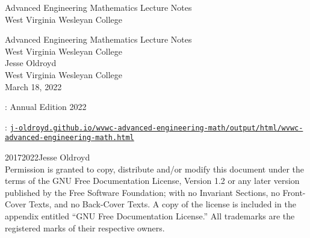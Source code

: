 \documentclass[twoside,10pt,]{book}
\newcommand{\titlepagefont}{\relax}
\newcommand{\mono}[1]{\texttt{#1}}
\numberwithin{equation}{part}
\begin{document}
\raggedbottom
\frontmatter
\thispagestyle{empty}
{\titlepagefont\centering
\vspace*{0.28\textheight}
{\Huge Advanced Engineering Mathematics Lecture Notes}\\[2\baselineskip]
{\LARGE West Virginia Wesleyan College}\\
}
\clearpage
\thispagestyle{empty}
\null%
\clearpage
\thispagestyle{empty}
{\titlepagefont\centering
\vspace*{0.14\textheight}
{\Huge Advanced Engineering Mathematics Lecture Notes}\\[\baselineskip]
{\LARGE West Virginia Wesleyan College}\\[3\baselineskip]
{\Large Jesse Oldroyd}\\[0.5\baselineskip]
{\Large West Virginia Wesleyan College}\\[3\baselineskip]
{\Large March 18, 2022}\\}
\clearpage
\thispagestyle{empty}
\hypertarget{x:colophon:front-colophon}{}
: Annual Edition 2022\par\medskip
{}: \href{https:\slash{}\slash{}j-oldroyd.github.io\slash{}wvwc-advanced-engineering-math\slash{}output\slash{}html\slash{}wvwc-advanced-engineering-math.html}{\mono{j-oldroyd.github.io/wvwc-advanced-engineering-math/output/html/wvwc-advanced-engineering-math.html}}\par\medskip
\noindent\textcopyright{}2017\textendash{}2022\quad{}Jesse Oldroyd\\[0.5\baselineskip]
Permission is granted to copy, distribute and\slash{}or modify this document under the terms of the GNU Free Documentation License, Version 1.2 or any later version published by the Free Software Foundation; with no Invariant Sections, no Front-Cover Texts, and no Back-Cover Texts.  A copy of the license is included in the appendix entitled ``GNU Free Documentation License.''  All trademarks\texttrademark{} are the registered\textregistered{} marks of their respective owners.\par\medskip
\end{document}
